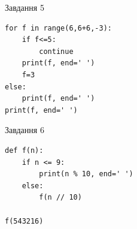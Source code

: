 \documentclass[12pt, ukrainian]{article}
\begin{document}
{\vspace{15mm}
\begin{minipage}[t]{9.7cm}                
{\begin{center}Завдання {5}\end{center}}
\begin{verbatim}
for f in range(6,6+6,-3):
    if f<=5:
        continue
    print(f, end=' ')
    f=3
else:
    print(f, end=' ')
print(f, end=' ')
\end{verbatim}     
\end{minipage}
\vline \hspace{8mm}
\begin{minipage}[t]{8.0cm}                
{\begin{center}Завдання {6}\end{center}}
\begin{verbatim}
def f(n):
    if n <= 9:
        print(n % 10, end=' ')
    else:
        f(n // 10)

f(543216)
\end{verbatim}     
\end{minipage}

}
\newpage
\end{document}
